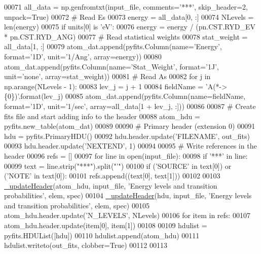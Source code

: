 \begin{DoxyCode}
00071     all\_data = np.genfromtxt(input\_file, comments=\textcolor{stringliteral}{'***'}, skip\_header=2, unpack=\textcolor{keyword}{True})
00072     \textcolor{comment}{# Read Es}
00073     energy = all\_data[0, :]
00074     NLevels = len(energy)
00075     \textcolor{keywordflow}{if} units[0] \textcolor{keywordflow}{is} \textcolor{stringliteral}{'eV'}: 
00076         energy = energy / (pn.CST.RYD\_EV * pn.CST.RYD\_ANG)
00077     \textcolor{comment}{# Read statistical weights}
00078     stat\_weight = all\_data[1, :]
00079     atom\_dat.append(pyfits.Column(name=\textcolor{stringliteral}{'Energy'}, format=\textcolor{stringliteral}{'1D'}, unit=\textcolor{stringliteral}{'1/Ang'}, array=energy))
00080     atom\_dat.append(pyfits.Column(name=\textcolor{stringliteral}{'Stat\_Weight'}, format=\textcolor{stringliteral}{'1J'}, unit=\textcolor{stringliteral}{'none'}, array=stat\_weight))    
00081     \textcolor{comment}{# Read As}
00082     \textcolor{keywordflow}{for} j \textcolor{keywordflow}{in} np.arange(NLevels - 1):
00083         lev\_j = j + 1
00084         fieldName = \textcolor{stringliteral}{'A(*->\{0\})'}.format(lev\_j)
00085         atom\_dat.append(pyfits.Column(name=fieldName, format=\textcolor{stringliteral}{'1D'}, unit=\textcolor{stringliteral}{'1/sec'}, array=all\_data[1 + lev\_j, 
      :]))
00086 
00087     \textcolor{comment}{# Create fits file and start adding info to the header}
00088     atom\_hdu = pyfits.new\_table(atom\_dat)   
00089             
00090     \textcolor{comment}{# Primary header (extension 0)}
00091     hdu = pyfits.PrimaryHDU()
00092     hdu.header.update(\textcolor{stringliteral}{'FILENAME'}, out\_fits)
00093     hdu.header.update(\textcolor{stringliteral}{'NEXTEND'}, 1)
00094  
00095     \textcolor{comment}{# Write references in the header}
00096     refs = []
00097     \textcolor{keywordflow}{for} line \textcolor{keywordflow}{in} open(input\_file):
00098         \textcolor{keywordflow}{if} \textcolor{stringliteral}{'***'} \textcolor{keywordflow}{in} line:
00099             text = line.strip(\textcolor{stringliteral}{"***"}).split(\textcolor{stringliteral}{"'"})
00100             \textcolor{keywordflow}{if} (\textcolor{stringliteral}{'SOURCE'} \textcolor{keywordflow}{in} text[0]) \textcolor{keywordflow}{or} (\textcolor{stringliteral}{'NOTE'} \textcolor{keywordflow}{in} text[0]):
00101                 refs.append((text[0], text[1]))
00102 
00103     \hyperlink{namespacepyneb_1_1utils_1_1fits_a2c9c6cf69be4278cdfb529f3a8f3dced}{\_updateHeader}(atom\_hdu, input\_file, \textcolor{stringliteral}{'Energy levels and transition probabilities'}, elem, 
      spec)
00104     \hyperlink{namespacepyneb_1_1utils_1_1fits_a2c9c6cf69be4278cdfb529f3a8f3dced}{\_updateHeader}(hdu, input\_file, \textcolor{stringliteral}{'Energy levels and transition probabilities'}, elem, spec)
00105     atom\_hdu.header.update(\textcolor{stringliteral}{'N\_LEVELS'}, NLevels)
00106     \textcolor{keywordflow}{for} item \textcolor{keywordflow}{in} refs:
00107         atom\_hdu.header.update(item[0], item[1])
00108 
00109     hdulist = pyfits.HDUList([hdu])
00110     hdulist.append(atom\_hdu)
00111     hdulist.writeto(out\_fits, clobber=\textcolor{keyword}{True})
00112 
00113 
\end{DoxyCode}
